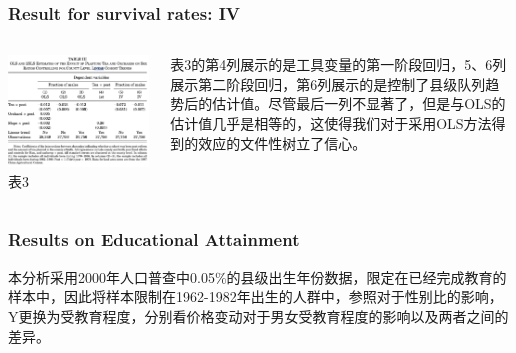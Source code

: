 \documentclass{beamer}
\begin{document}
\begin{frame}
    \frametitle{Result for survival rates: IV }
     \begin{columns}
            \begin{minipage}[c][0.4\textheight][c]{\linewidth}
                \centering
                \includegraphics[scale=0.3]{table3}
                表3
            \end{minipage}
            \begin{minipage}[c][0.4\textheight][c]{\linewidth}
            表3的第4列展示的是工具变量的第一阶段回归，5、6列展示第二阶段回归，第6列展示的是控制了县级队列趋势后的估计值。尽管最后一列不显著了，但是与OLS的估计值几乎是相等的，这使得我们对于采用OLS方法得到的效应的文件性树立了信心。
            \end{minipage}
    \end{columns} 
\end{frame}



\begin{frame}
    \frametitle{Results on Educational Attainment}
    本分析采用2000年人口普查中0.05\%的县级出生年份数据，限定在已经完成教育的样本中，因此将样本限制在1962-1982年出生的人群中，参照对于性别比的影响，Y更换为受教育程度，分别看价格变动对于男女受教育程度的影响以及两者之间的差异。
\end{frame}
\end{document}

